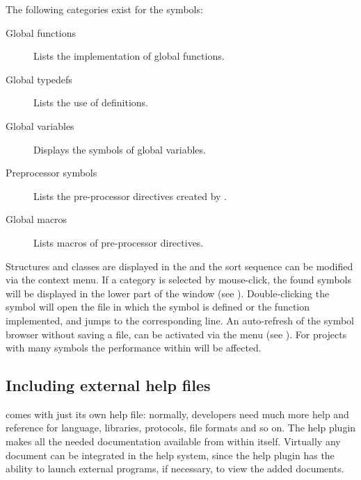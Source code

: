 
The following categories exist for the symbols:

\begin{description}
\item[Global functions] Lists the implementation of global functions.
\item[Global typedefs] Lists the use of  definitions.
\item[Global variables] Displays the symbols of global variables.
\item[Preprocessor symbols] Lists the pre-processor directives created by .
\item[Global macros] Lists macros of pre-processor directives.
\end{description}


Structures and classes are displayed in the  and the sort sequence can be modified via the context menu. If a category is selected by mouse-click, the found symbols will be displayed in the lower part of the window (see ). Double-clicking the symbol will open the file in which the symbol is defined or the function implemented, and jumps to the corresponding line. An auto-refresh of the symbol browser without saving a file, can be activated via the menu   (see ). For projects with many symbols the performance within \codeblocks will be affected.



\subsection{Including external help files}

\codeblocks comes with just its own help file: normally, developers need much more help and reference for language, libraries, protocols, file formats and so on. The help plugin makes all the needed documentation available from within \codeblocks itself. Virtually any document can be integrated in the \codeblocks help system, since the help plugin has the ability to launch external programs, if necessary, to view the added documents.

